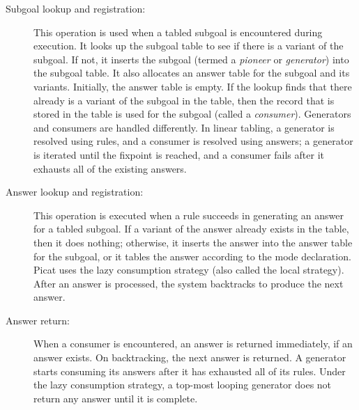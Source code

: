 \begin{description}
\item[Subgoal lookup and registration:] This operation is used when a tabled subgoal is encountered during execution. It looks up the subgoal table to see if there is a variant of the subgoal. If not, it inserts the subgoal (termed a \emph{pioneer} or \emph{generator}) into the subgoal table. It also allocates an answer table for the subgoal and its variants. Initially, the answer table is empty. If the lookup finds that there already is a variant of the subgoal in the table, then the record that is stored in the table is used for the subgoal (called a \emph{consumer}). Generators and consumers are handled differently. In linear tabling, a generator is resolved using rules, and a consumer is resolved using answers; a generator is iterated until the fixpoint is reached, and a consumer fails after it exhausts all of the existing answers.
\item[Answer lookup and registration:] This operation is executed when a rule succeeds in generating an answer for a tabled subgoal. If a variant of the answer already exists in the table, then it does nothing; otherwise, it inserts the answer into the answer table for the subgoal, or it tables the answer according to the mode declaration. Picat uses the lazy consumption strategy (also called the local strategy). After an answer is processed, the system backtracks to produce the next answer. 
\item[Answer return:] When a consumer is encountered, an answer is returned immediately, if an answer exists. On backtracking, the next answer is returned. A generator starts consuming its answers after it has exhausted all of its rules. Under the lazy consumption strategy, a top-most looping generator does not return any answer until it is complete.
\end{description}


\ignore{

}
